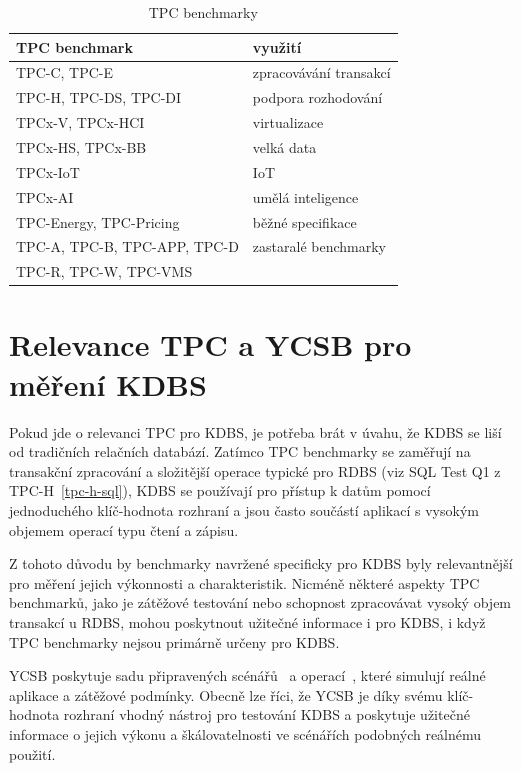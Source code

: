 \documentclass[czech,master,dept460,male,csharp,cpdeclaration]{diploma}
\begin{document}
	\begin{table}
		\centering
		\begin{tabular}{ l | l }
			\toprule
			TPC benchmark & využití\\
			\midrule
			TPC-C, TPC-E & zpracovávání transakcí \\
			TPC-H, TPC-DS, TPC-DI & podpora rozhodování \\
			TPCx-V, TPCx-HCI & virtualizace \\
			TPCx-HS, TPCx-BB & velká data \\
			TPCx-IoT & IoT \\
			TPCx-AI & umělá inteligence \\
			TPC-Energy, TPC-Pricing & běžné specifikace \\
			TPC-A, TPC-B, TPC-APP, TPC-D & zastaralé benchmarky \\
			TPC-R, TPC-W, TPC-VMS & \\
			\bottomrule
		\end{tabular}
		\caption{TPC benchmarky\label{tab_tpc_modely}}
	\end{table}
	
	\section{Relevance TPC a YCSB pro měření KDBS}
	
	Pokud jde o relevanci TPC pro KDBS, je potřeba brát v úvahu, že KDBS se liší od tradičních relačních databází. Zatímco TPC benchmarky se zaměřují na transakční zpracování a složitější operace typické pro RDBS (viz SQL Test Q1 z TPC-H~\ref{tpc-h-sql}), KDBS se používají pro přístup k datům pomocí jednoduchého klíč-hodnota rozhraní a jsou často součástí aplikací s vysokým objemem operací typu čtení a zápisu.
	
	Z tohoto důvodu by benchmarky navržené specificky pro KDBS byly relevantnější pro měření jejich výkonnosti a charakteristik. Nicméně některé aspekty TPC benchmarků, jako je zátěžové testování nebo schopnost zpracovávat vysoký objem transakcí u RDBS, mohou poskytnout užitečné informace i pro KDBS, i když TPC benchmarky nejsou primárně určeny pro KDBS.
	
	YCSB poskytuje sadu připravených scénářů~\cite{workloads} a operací~\cite{ycsb-properties}, které simulují reálné aplikace a zátěžové podmínky. Obecně lze říci, že YCSB je díky svému klíč-hodnota rozhraní vhodný nástroj pro testování KDBS a poskytuje užitečné informace o jejich výkonu a škálovatelnosti ve scénářích podobných reálnému použití.
	
\end{document}
